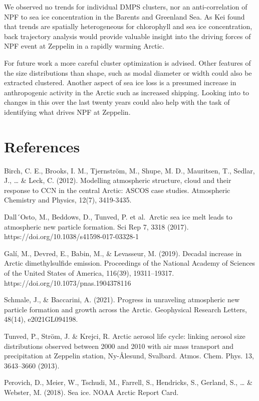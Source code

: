 \documentclass[11pt]{article}
\makeatletter
\newcommand{\boxspacing}{\kern\kvtcb@left@rule\kern\kvtcb@boxsep}
\newcommand{\prompt}[4]{
        {\ttfamily\llap{{\color{#2}[#3]:\hspace{3pt}#4}}\vspace{-\baselineskip}}
    }
\makeatother
\begin{document}
We observed no trends for individual DMPS clusters, nor an
anti-correlation of NPF to sea ice concentration in the Barents and
Greenland Sea. As Kei found that trends are spatially heterogeneous for
chlorophyll and sea ice concentration, back trajectory analysis would
provide valuable insight into the driving forces of NPF event at
Zeppelin in a rapidly warming Arctic.

For future work a more careful cluster optimization is advised. Other
features of the size distributions than shape, such as modal diameter or
width could also be extracted clustered. Another aspect of sea ice loss
is a presumed increase in anthropogenic activity in the Arctic such as
increased shipping. Looking into to changes in this over the last twenty
years could also help with the task of identifying what drives NPF at
Zeppelin.

    \hypertarget{references}{%
\section{References}\label{references}}

Birch, C. E., Brooks, I. M., Tjernström, M., Shupe, M. D., Mauritsen,
T., Sedlar, J., \ldots{} \& Leck, C. (2012). Modelling atmospheric
structure, cloud and their response to CCN in the central Arctic: ASCOS
case studies. Atmospheric Chemistry and Physics, 12(7), 3419-3435.

Dall´Osto, M., Beddows, D., Tunved, P. et al.~Arctic sea ice melt leads
to atmospheric new particle formation. Sci Rep 7, 3318 (2017).
https://doi.org/10.1038/s41598-017-03328-1

Galí, M., Devred, E., Babin, M., \& Levasseur, M. (2019). Decadal
increase in Arctic dimethylsulfide emission. Proceedings of the National
Academy of Sciences of the United States of America, 116(39),
19311--19317. https://doi.org/10.1073/pnas.1904378116

Schmale, J., \& Baccarini, A. (2021). Progress in unraveling atmospheric
new particle formation and growth across the Arctic. Geophysical
Research Letters, 48(14), e2021GL094198.

Tunved, P., Ström, J. \& Krejci, R. Arctic aerosol life cycle: linking
aerosol size distributions observed between 2000 and 2010 with air mass
transport and precipitation at Zeppelin station, Ny-Ålesund, Svalbard.
Atmos. Chem. Phys. 13, 3643--3660 (2013).

Perovich, D., Meier, W., Tschudi, M., Farrell, S., Hendricks, S.,
Gerland, S., \ldots{} \& Webster, M. (2018). Sea ice. NOAA Arctic Report
Card.

    \begin{tcolorbox}[breakable, size=fbox, boxrule=1pt, pad at break*=1mm,colback=cellbackground, colframe=cellborder]
\prompt{In}{incolor}{ }{\boxspacing}
\begin{Verbatim}[commandchars=\\\{\}]

\end{Verbatim}
\end{tcolorbox}


    
    
    
\end{document}
